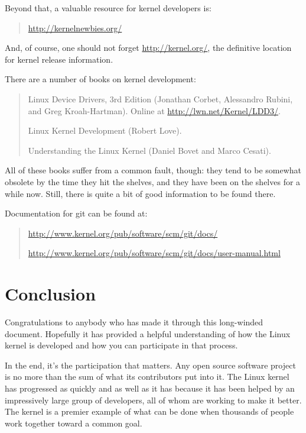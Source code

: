 \documentclass[a4paper,8pt,english]{sphinxmanual}
\begin{document}
Beyond that, a valuable resource for kernel developers is:
\begin{quote}

\href{http://kernelnewbies.org/}{http://kernelnewbies.org/}
\end{quote}

And, of course, one should not forget \href{http://kernel.org/}{http://kernel.org/}, the definitive
location for kernel release information.

There are a number of books on kernel development:
\begin{quote}

Linux Device Drivers, 3rd Edition (Jonathan Corbet, Alessandro
Rubini, and Greg Kroah-Hartman).  Online at
\href{http://lwn.net/Kernel/LDD3/}{http://lwn.net/Kernel/LDD3/}.

Linux Kernel Development (Robert Love).

Understanding the Linux Kernel (Daniel Bovet and Marco Cesati).
\end{quote}

All of these books suffer from a common fault, though: they tend to be
somewhat obsolete by the time they hit the shelves, and they have been on
the shelves for a while now.  Still, there is quite a bit of good
information to be found there.

Documentation for git can be found at:
\begin{quote}

\href{http://www.kernel.org/pub/software/scm/git/docs/}{http://www.kernel.org/pub/software/scm/git/docs/}

\href{http://www.kernel.org/pub/software/scm/git/docs/user-manual.html}{http://www.kernel.org/pub/software/scm/git/docs/user-manual.html}
\end{quote}


\section{Conclusion}
\label{process/8.Conclusion:conclusion}
Congratulations to anybody who has made it through this long-winded
document.  Hopefully it has provided a helpful understanding of how the
Linux kernel is developed and how you can participate in that process.

In the end, it's the participation that matters.  Any open source software
project is no more than the sum of what its contributors put into it.  The
Linux kernel has progressed as quickly and as well as it has because it has
been helped by an impressively large group of developers, all of whom are
working to make it better.  The kernel is a premier example of what can be
done when thousands of people work together toward a common goal.
\end{document}
